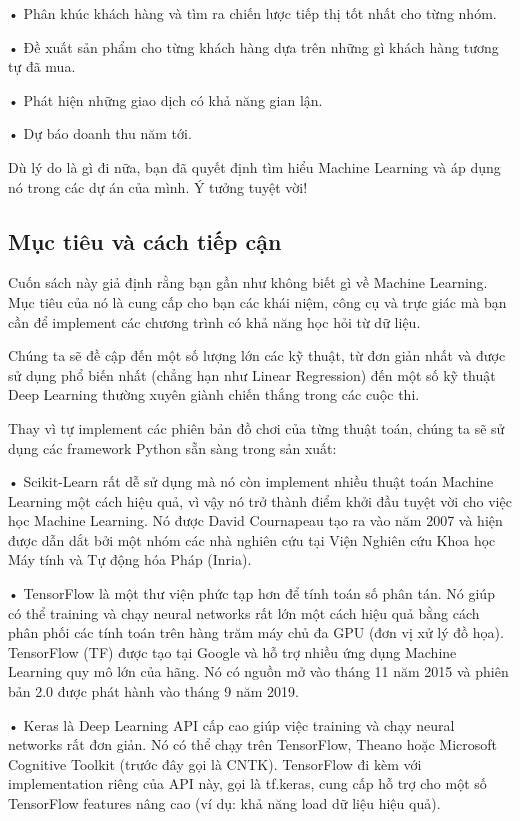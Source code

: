 • Phân khúc khách hàng và tìm ra chiến lược tiếp thị tốt nhất cho từng nhóm.

• Đề xuất sản phẩm cho từng khách hàng dựa trên những gì khách hàng tương tự đã mua.

• Phát hiện những giao dịch có khả năng gian lận.

• Dự báo doanh thu năm tới.

Dù lý do là gì đi nữa, bạn đã quyết định tìm hiểu Machine Learning và áp dụng nó trong các dự án của mình. Ý tưởng tuyệt vời!

\subsection{Mục tiêu và cách tiếp cận}

Cuốn sách này giả định rằng bạn gần như không biết gì về Machine Learning. Mục tiêu của nó là cung cấp cho bạn các khái niệm, công cụ và trực giác mà bạn cần để implement các chương trình có khả năng học hỏi từ dữ liệu.

Chúng ta sẽ đề cập đến một số lượng lớn các kỹ thuật, từ đơn giản nhất và được sử dụng phổ biến nhất (chẳng hạn như Linear Regression) đến một số kỹ thuật Deep Learning thường xuyên giành chiến thắng trong các cuộc thi.

Thay vì tự implement các phiên bản đồ chơi của từng thuật toán, chúng ta sẽ sử dụng các framework Python sẵn sàng trong sản xuất:

• Scikit-Learn rất dễ sử dụng mà nó còn implement nhiều thuật toán Machine Learning một cách hiệu quả, vì vậy nó trở thành điểm khởi đầu tuyệt vời cho việc học Machine Learning. Nó được David Cournapeau tạo ra vào năm 2007 và hiện được dẫn dắt bởi một nhóm các nhà nghiên cứu tại Viện Nghiên cứu Khoa học Máy tính và Tự động hóa Pháp (Inria).

• TensorFlow là một thư viện phức tạp hơn để tính toán số phân tán. Nó giúp có thể training và chạy neural networks rất lớn một cách hiệu quả bằng cách phân phối các tính toán trên hàng trăm máy chủ đa GPU (đơn vị xử lý đồ họa). TensorFlow (TF) được tạo tại Google và hỗ trợ nhiều ứng dụng Machine Learning quy mô lớn của hãng. Nó có nguồn mở vào tháng 11 năm 2015 và phiên bản 2.0 được phát hành vào tháng 9 năm 2019.

• Keras là Deep Learning API cấp cao giúp việc training và chạy neural networks rất đơn giản. Nó có thể chạy trên TensorFlow, Theano hoặc Microsoft Cognitive Toolkit (trước đây gọi là CNTK). TensorFlow đi kèm với implementation riêng của API này, gọi là tf.keras, cung cấp hỗ trợ cho một số TensorFlow features nâng cao (ví dụ: khả năng load dữ liệu hiệu quả).

